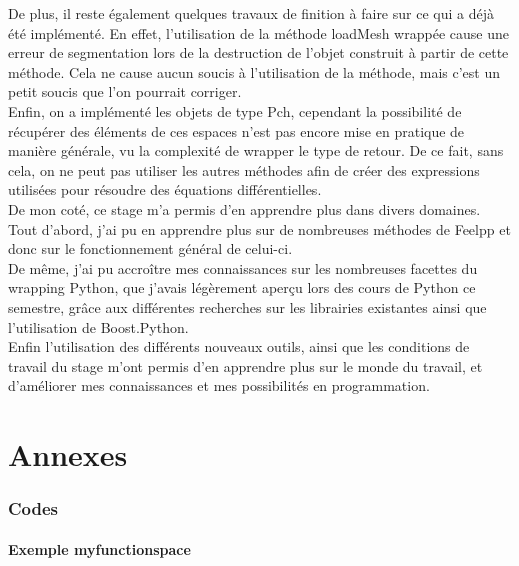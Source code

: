\documentclass[french,12pt]{article}
\begin{document}
De plus, il reste également quelques travaux de finition à faire sur ce qui a déjà été implémenté.
En effet, l'utilisation de la méthode loadMesh wrappée cause une erreur de segmentation lors de la destruction de l'objet construit à partir de cette méthode. Cela ne cause aucun soucis à l'utilisation de la méthode, mais c'est un petit soucis que l'on pourrait corriger.\\

Enfin, on a implémenté les objets de type Pch, cependant la possibilité de récupérer des éléments de ces espaces n'est pas encore mise en pratique de manière générale, vu la complexité de wrapper le type de retour. De ce fait, sans cela, on ne peut pas utiliser les autres méthodes afin de créer des expressions utilisées pour résoudre des équations différentielles.\\

De mon coté, ce stage m'a permis d'en apprendre plus dans divers domaines. Tout d'abord, j'ai pu en apprendre plus sur de nombreuses méthodes de Feelpp et donc sur le fonctionnement général de celui-ci.\\

De même, j'ai pu accroître mes connaissances sur les nombreuses facettes du wrapping Python, que j'avais légèrement aperçu lors des cours de Python ce semestre, grâce aux différentes recherches sur les librairies existantes ainsi que l'utilisation de Boost.Python.\\

Enfin l'utilisation des différents nouveaux outils,  ainsi que les conditions de travail du stage m'ont permis d'en apprendre plus sur le monde du travail, et d'améliorer mes connaissances et mes possibilités en programmation.

\newpage
\part{Annexes}
\section{Codes}

\subsection{Exemple myfunctionspace}
\end{document}
